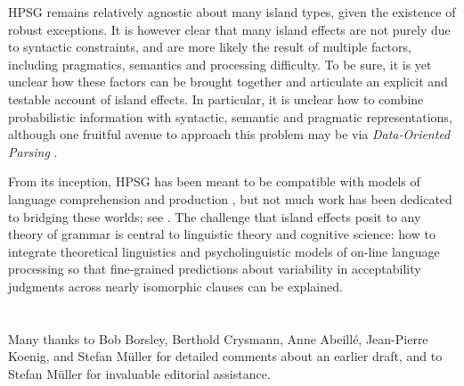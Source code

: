 \documentclass[output=paper,biblatex,babelshorthands,newtxmath,draftmode,colorlinks,citecolor=brown]{langscibook}
\begin{document}
HPSG remains relatively agnostic about many island types, given the existence of robust exceptions.
It is however clear that many island effects are not purely due to syntactic constraints, and are
more likely the result of multiple factors, including pragmatics, semantics and processing
difficulty.  To be sure, it is yet unclear how these factors can be brought together and articulate
an explicit and testable account of island effects. In particular, it is unclear how to combine
probabilistic information with syntactic, semantic and pragmatic representations, although one
fruitful avenue to approach this problem may be via \emph{Data-Oriented Parsing}
\citep{NF2002a-u,NF99a,Arnold:Linardaki:07,BSS2003a-ed,Bod2009a}.


From its inception, HPSG has been meant to be compatible with models of language comprehension and
production \citep{sagser,Sag:Wasow:ta,Sag:Wasow:ta2}, but not much work has been dedicated to
bridging these worlds; see . The challenge that island effects posit to
any theory of grammar is central to linguistic theory and cognitive science: how to integrate
theoretical linguistics and psycholinguistic models of on-line language processing so that
fine-grained predictions about variability in acceptability judgments across nearly isomorphic
clauses can be explained.


 
\section*{\acknowledgmentsUS}

Many thanks to Bob Borsley, Berthold Crysmann, Anne Abeillé, Jean-Pierre Koenig, and Stefan Müller
for detailed comments about an earlier draft, and to Stefan Müller for invaluable editorial
assistance.

{\sloppy
\printbibliography[heading=subbibliography,notkeyword=this] 
}
\end{document}
